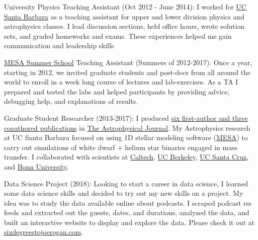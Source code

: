\documentclass[10pt]{article} %
\begin{document}
\jobb
{University Physics Teaching Assistant (Oct 2012 - June 2014):}
{I worked for \href{http://www.ucsb.edu}{UC Santa Barbara} as a teaching assistant for upper and lower division physics and astrophysics classes.}
{I lead discussion sections, held office hours, wrote solution sets, and graded homeworks and exams. These experiences helped me gain communication and leadership skills}%

\jobb
{\href{http://cococubed.asu.edu/mesa_summer_school_2017/}{MESA Summer School} Teaching Assistant (Summers of 2012-2017):}
{Once a year, starting in 2012, we invited graduate students and post-docs from all around the world to enroll in a week long course of lectures and lab-exercises.}%
{As a TA I prepared and tested the labs and helped participants by providing advice, debugging help, and explanations of results.}

\jobb
{Graduate Student Researcher (2013-2017):}
{I produced \href{http://adsabs.harvard.edu/cgi-bin/nph-abs_connect?library&libname=MyPapers&libid=561872b258}{six first-author and three coauthored publications} in \href{http://iopscience.iop.org/journal/0004-637X}{The Astrophysical Journal}.}
{My Astrophysics research at UC Santa Barbara focused on using 1D stellar modeling software (\href{http://mesa.sourceforge.net/}{MESA}) to carry out simulations of white dwarf + helium star binaries engaged in mass transfer. I collaborated with scientists at \href{https://www.caltech.edu/}{Caltech}, \href{www.berkeley.edu/}{UC Berkeley}, \href{https://www.ucsc.edu}{UC Santa Cruz}, and \href{https://www.uni-bonn.de/}{Bonn University}.}%

\jobb
{Data Science Project (2018):}
{Looking to start a career in data science, I learned some data science skills and decided to try out my new skills on a project. My idea was to study the data available online about podcasts.}
{I scraped podcast rss feeds and extracted out the guests, dates, and durations, analyzed the data, and built an interactive website to display and explore the data. Please check it out at \href{https://www.sixdegreestojoerogan.com/}{sixdegreestojoerogan.com}}.
\end{document}
